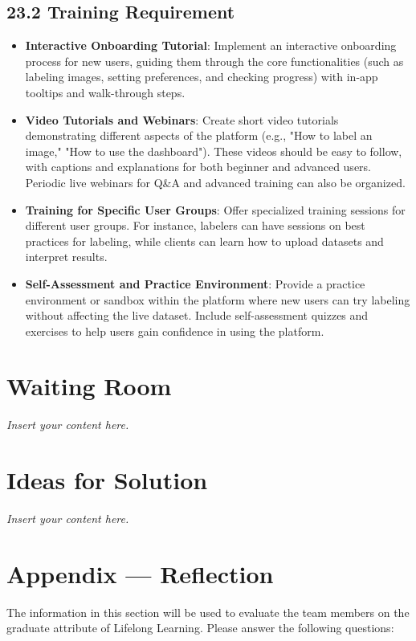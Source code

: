 \documentclass[12pt]{article}
\newcommand{\lips}{\textit{Insert your content here.}}
\begin{document}
\subsection*{23.2 Training Requirement}
\begin{itemize}[leftmargin=2cm]
    \item \textbf{Interactive Onboarding Tutorial}: Implement an interactive onboarding process for new users, guiding them through the core functionalities (such as labeling images, setting preferences, and checking progress) with in-app tooltips and walk-through steps.
    \item \textbf{Video Tutorials and Webinars}: Create short video tutorials demonstrating different aspects of the platform (e.g., "How to label an image," "How to use the dashboard"). These videos should be easy to follow, with captions and explanations for both beginner and advanced users. Periodic live webinars for Q\&A and advanced training can also be organized.
    \item \textbf{Training for Specific User Groups}: Offer specialized training sessions for different user groups. For instance, labelers can have sessions on best practices for labeling, while clients can learn how to upload datasets and interpret results.
    \item \textbf{Self-Assessment and Practice Environment}: Provide a practice environment or sandbox within the platform where new users can try labeling without affecting the live dataset. Include self-assessment quizzes and exercises to help users gain confidence in using the platform.
\end{itemize}

\section{Waiting Room}
\lips

\section{Ideas for Solution}
\lips

\newpage{}
\section*{Appendix --- Reflection}

The information in this section will be used to evaluate the team members on the
graduate attribute of Lifelong Learning.  Please answer the following questions:
\end{document}
